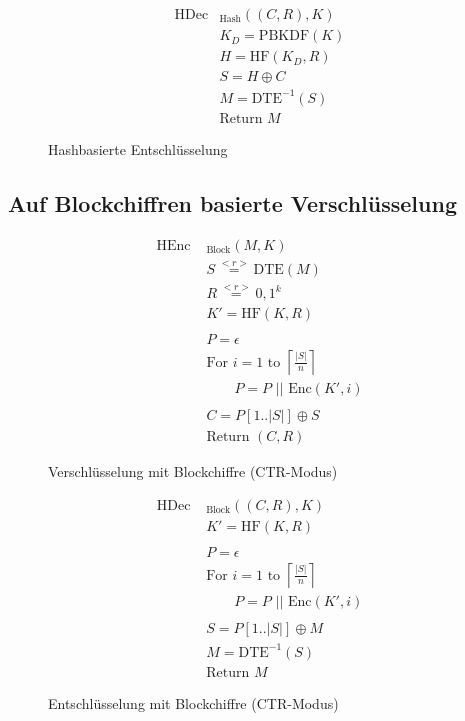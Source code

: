 \documentclass[12pt]{scrartcl}
\begin{document}
\begin{figure}[h]
	\begin{align*}
		\text{HDec}&_{\text{Hash}}((C,R), K)\\
		&K_D = \text{PBKDF}(K)\\ 		%
		&H = \text{HF}(K_D,R)\\	%
		&S = H \oplus C\\	%
		&M = \text{DTE}^{-1}(S)\\ 	%
		&\text{Return } M
	\end{align*}
	\caption{Hashbasierte Entschlüsselung}
	\label{fig:HashDec}
\end{figure}

\subsection{Auf Blockchiffren basierte Verschlüsselung}

\begin{figure}[h]
	\begin{align*}
		\text{HEnc }&_{\text{Block}}(M, K)\\
		&S \overset{<r>}{=} \text{DTE}(M)\\ 	%
		&R \overset{<r>}{=} {0,1}^k\\	%
		&K' = \text{HF}(K,R)\\ 		%
		\\
		&P = \epsilon \\
		&\text{For } i = 1 \text{ to } \left\lceil \frac{|S|}{n} \right\rceil \\
		&\qquad P = P \text{ || Enc}(K',i)\\	%
		\\
		&C = P[1 .. |S|] \oplus S\\	%
		&\text{Return } (C,R)
	\end{align*}
	\caption{Verschlüsselung mit Blockchiffre (CTR-Modus)}
	\label{fig:BlockEnc}
\end{figure}

\begin{figure}[h]
	\begin{align*}
		\text{HDec }&_{\text{Block}}((C,R), K)\\
		&K' = \text{HF}(K,R)\\ 		%
		\\
		&P = \epsilon \\
		&\text{For } i = 1 \text{ to } \left\lceil \frac{|S|}{n} \right\rceil \\
		&\qquad P = P \text{ || Enc}(K',i)\\	%
		\\
		&S = P[1 .. |S|] \oplus M\\	%
		&M = \text{DTE}^{-1}(S)\\ 	%
		&\text{Return } M
	\end{align*}
	\caption{Entschlüsselung mit Blockchiffre (CTR-Modus)}
	\label{fig:BlockDec}
\end{figure}
\end{document}
